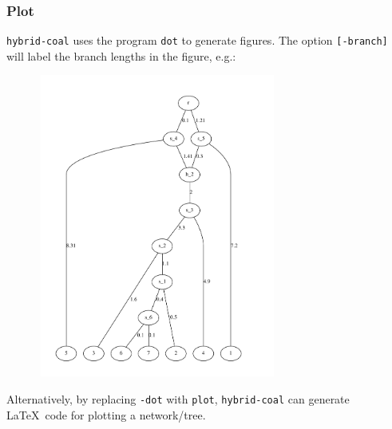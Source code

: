 \subsubsection{Plot}
{\tt hybrid-coal} uses the program {\tt dot} to generate figures. The option {\tt [-branch]} will label the branch lengths in the figure, e.g.:
\begin{center}
\includegraphics[width=10cm,height=10cm]{branch.pdf}
\end{center}

Alternatively, by replacing {\tt -dot} with {\tt plot}, {\tt hybrid-coal} can generate \LaTeX \ code for plotting a network/tree.


